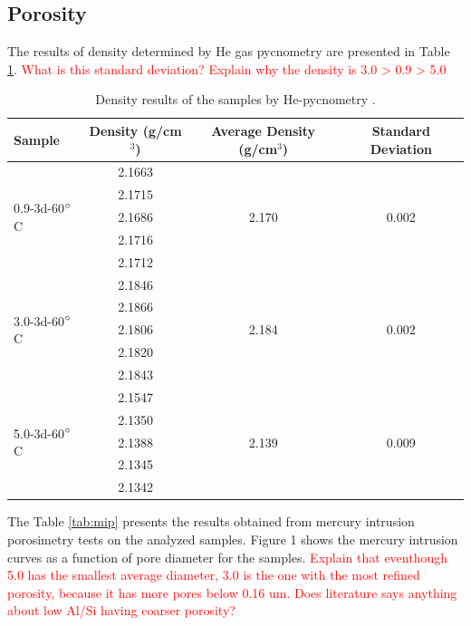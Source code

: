 \subsection{Porosity}

The results of density determined by He gas pycnometry are presented in Table \ref{tab:he_pycnometry}.
\textcolor{red}{What is this standard deviation?}
\textcolor{red}{Explain why the density is 3.0 > 0.9 > 5.0}

\begin{table}[H]
  \centering
  \caption{Density results of the samples by He-pycnometry \label{tab:he_pycnometry}.}
  \begin{tabular}{lccc}
    \hline
    Sample & Density (g/cm$^3$) & Average Density (g/cm$^3$) & Standard Deviation \\ 
    \hline
    \multirow{5}{*}{0.9-3d-60$^{\circ}$C} 
    & 2.1663 & \multirow{5}{*}{2.170} & \multirow{5}{*}{0.002} \\
    & 2.1715 &  &  \\
    & 2.1686 &  &  \\
    & 2.1716 &  &  \\
    & 2.1712 &  &  \\ 
    \hline
    \multirow{5}{*}{3.0-3d-60$^{\circ}$C} 
    & 2.1846 & \multirow{5}{*}{2.184} & \multirow{5}{*}{0.002} \\
    & 2.1866 &  &  \\
    & 2.1806 &  &  \\
    & 2.1820 &  &  \\
    & 2.1843 &  &  \\ 
    \hline
    \multirow{5}{*}{5.0-3d-60$^{\circ}$C} 
    & 2.1547 & \multirow{5}{*}{2.139} & \multirow{5}{*}{0.009} \\
    & 2.1350 &  &  \\
    & 2.1388 &  &  \\
    & 2.1345 &  &  \\
    & 2.1342 &  &  \\ 
    \hline
  \end{tabular}
\end{table}


The Table \ref{tab:mip} presents the results obtained from mercury intrusion porosimetry tests on the analyzed samples.
Figure 1 shows the mercury intrusion curves as a function of pore diameter for the samples.
\textcolor{red}{Explain that eventhough 5.0 has the smallest average diameter, 3.0 is the one with the most refined porosity, because it has more pores below 0.16 um. Does literature says anything about low Al/Si having coarser porosity?}

